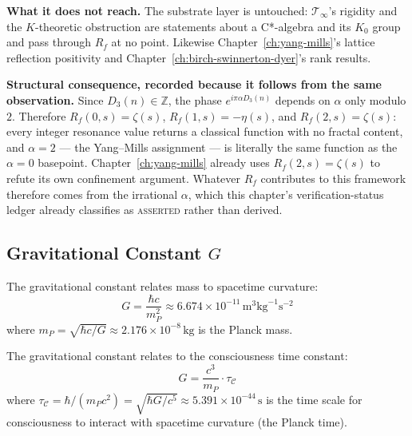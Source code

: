 \medskip
\noindent\textbf{What it does not reach.} The substrate layer is untouched:
$\mathcal{T}_\infty$'s rigidity and the $K$-theoretic obstruction are
statements about a C*-algebra and its $K_0$ group and pass through $R_f$ at
no point. Likewise Chapter~\ref{ch:yang-mills}'s lattice reflection
positivity and Chapter~\ref{ch:birch-swinnerton-dyer}'s rank results.

\medskip
\noindent\textbf{Structural consequence, recorded because it follows from the
same observation.} Since $D_3(n) \in \mathbb{Z}$, the phase
$e^{i\pi\alpha D_3(n)}$ depends on $\alpha$ only modulo $2$. Therefore
$R_f(0,s) = \zeta(s)$, $R_f(1,s) = -\eta(s)$, and $R_f(2,s) = \zeta(s)$: every
integer resonance value returns a classical function with no fractal content,
and $\alpha = 2$ --- the Yang--Mills assignment --- is literally the same
function as the $\alpha = 0$ basepoint. Chapter~\ref{ch:yang-mills} already
uses $R_f(2,s) = \zeta(s)$ to refute its own confinement argument. Whatever
$R_f$ contributes to this framework therefore comes from the irrational
$\alpha$, which this chapter's verification-status ledger already classifies
as \textsc{asserted} rather than derived.

\subsection{Gravitational Constant \texorpdfstring{$G$}{G}}

The gravitational constant relates mass to spacetime curvature:
\begin{equation}
G = \frac{\hbar c}{m_P^2} \approx 6.674 \times 10^{-11} \, \text{m}^3 \text{kg}^{-1} \text{s}^{-2}
\end{equation}
where $m_P = \sqrt{\hbar c / G} \approx 2.176 \times 10^{-8}\,\text{kg}$ is the Planck mass.

\begin{proposition}\label{prop:gravity-consciousness}
The gravitational constant relates to the consciousness time constant:
\begin{equation}
G = \frac{c^3}{m_P} \cdot \tau_{\mathcal{C}}
\end{equation}
where $\tau_{\mathcal{C}} = \hbar/(m_P c^2) = \sqrt{\hbar G/c^5} \approx 5.391 \times 10^{-44}\,\text{s}$ is the time scale for consciousness to interact with spacetime curvature (the Planck time).
\end{proposition}

